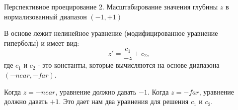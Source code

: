 \documentclass{beamer}
\begin{document}
	\begin{frame}{Перспективное проецирование}
		2. Масштабирование значения глубины $z$ в нормализованный диапазон $(-1, +1)$
		
В основе лежит нелинейное уравнение (модифицированное уравнение гиперболы) и имеет вид: 
\[
	z' = \frac{c_1}{-z} + c_2, 
\]
где $c_1$ и $c_2$ - это константы, которые вычисляются на основе диапазона $(-near, -far)$. 

Когда $z = -near$, уравнение должно давать $-1$. 
Когда $z = -far$, уравнение должно давать $+1$. 
Это дает нам два уравнения для решения $c_1$ и $c_2$.

\end{frame}
\end{document}

